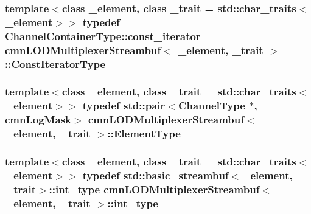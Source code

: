 \hypertarget{classcmn_l_o_d_multiplexer_streambuf_ad60c91a0708ddcaf266d48f09d37bb63}{
\subsubsection[{Const\-Iterator\-Type}]{\setlength{\rightskip}{0pt plus 5cm}template$<$class \-\_\-element, class \-\_\-trait = std\-::char\-\_\-traits$<$\-\_\-element$>$$>$ typedef Channel\-Container\-Type\-::const\-\_\-iterator {\bf cmn\-L\-O\-D\-Multiplexer\-Streambuf}$<$ \-\_\-element, \-\_\-trait $>$\-::{\bf Const\-Iterator\-Type}}}\label{classcmn_l_o_d_multiplexer_streambuf_ad60c91a0708ddcaf266d48f09d37bb63}
\hypertarget{classcmn_l_o_d_multiplexer_streambuf_ac397e28a9605093b41ec53ac52eefef5}{
\subsubsection[{Element\-Type}]{\setlength{\rightskip}{0pt plus 5cm}template$<$class \-\_\-element, class \-\_\-trait = std\-::char\-\_\-traits$<$\-\_\-element$>$$>$ typedef std\-::pair$<${\bf Channel\-Type} $\ast$, {\bf cmn\-Log\-Mask}$>$ {\bf cmn\-L\-O\-D\-Multiplexer\-Streambuf}$<$ \-\_\-element, \-\_\-trait $>$\-::{\bf Element\-Type}}}\label{classcmn_l_o_d_multiplexer_streambuf_ac397e28a9605093b41ec53ac52eefef5}
\hypertarget{classcmn_l_o_d_multiplexer_streambuf_a8d1eadc5cf72b594aa2c2fef6401fe47}{
\subsubsection[{int\-\_\-type}]{\setlength{\rightskip}{0pt plus 5cm}template$<$class \-\_\-element, class \-\_\-trait = std\-::char\-\_\-traits$<$\-\_\-element$>$$>$ typedef std\-::basic\-\_\-streambuf$<$\-\_\-element, \-\_\-trait$>$\-::{\bf int\-\_\-type} {\bf cmn\-L\-O\-D\-Multiplexer\-Streambuf}$<$ \-\_\-element, \-\_\-trait $>$\-::{\bf int\-\_\-type}\hspace{0.3cm}{\ttfamily [protected]}}}\label{classcmn_l_o_d_multiplexer_streambuf_a8d1eadc5cf72b594aa2c2fef6401fe47}
